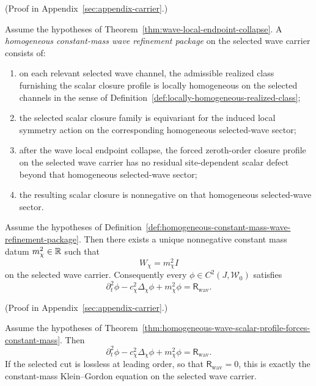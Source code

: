 (Proof in Appendix~\ref{sec:appendix-carrier}.)

\begin{definition}
\label{def:homogeneous-constant-mass-wave-refinement-package}
Assume the hypotheses of
Theorem~\ref{thm:wave-local-endpoint-collapse}. A
\emph{homogeneous constant-mass wave refinement package} on the selected wave
carrier consists of:
\begin{enumerate}[label=(\roman*),itemsep=0.2em]
\item on each relevant selected wave channel, the admissible realized class
      furnishing the scalar closure profile is locally homogeneous on the
      selected channels in the sense of
      Definition~\ref{def:locally-homogeneous-realized-class};
\item the selected scalar closure family is equivariant for the induced local
      symmetry action on the corresponding homogeneous selected-wave sector;
\item after the wave local endpoint collapse, the forced zeroth-order closure
      profile on the selected wave carrier has no residual site-dependent
      scalar defect beyond that homogeneous selected-wave sector;
\item the resulting scalar closure is nonnegative on that homogeneous
      selected-wave sector.
\end{enumerate}
\end{definition}

\begin{theorem}
\label{thm:homogeneous-wave-scalar-profile-forces-constant-mass}
Assume the hypotheses of
Definition~\ref{def:homogeneous-constant-mass-wave-refinement-package}. Then
there exists a unique nonnegative constant mass datum \(m_{\chi}^2\in\mathbb{R}\)
such that
\[
W_{\chi}=m_{\chi}^2 I
\]
on the selected wave carrier. Consequently every
\(\phi\in C^2(J,\mathcal W_0)\) satisfies
\[
\partial_t^2\phi
-
c_{\chi}^2\Delta_{\chi}\phi
+
m_{\chi}^2\phi
=
\mathsf R_{\mathrm{wav}}.
\]
\end{theorem}

(Proof in Appendix~\ref{sec:appendix-carrier}.)

\begin{corollary}
\label{cor:exact-recognizable-klein-gordon-identity}
Assume the hypotheses of
Theorem~\ref{thm:homogeneous-wave-scalar-profile-forces-constant-mass}. Then
\[
\partial_t^2\phi
-
c_{\chi}^2\Delta_{\chi}\phi
+
m_{\chi}^2\phi
=
\mathsf R_{\mathrm{wav}}.
\]
If the selected cut is lossless at leading order, so that
\(\mathsf R_{\mathrm{wav}}=0\), this is exactly the constant-mass
Klein--Gordon equation on the selected wave carrier.
\end{corollary}

